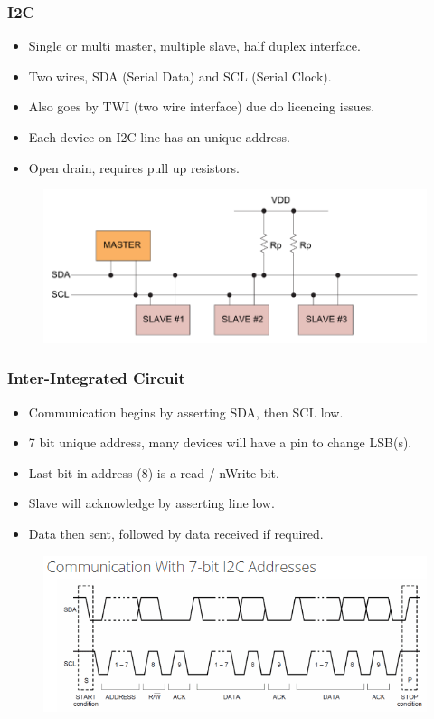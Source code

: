 \documentclass[t]{beamer}
\begin{document}

\begin{frame}[t]
\frametitle{I2C}
\begin{itemize}
	\item Single or multi master, multiple slave, half duplex interface.
	\item Two wires, SDA (Serial Data) and SCL (Serial Clock).
	\item Also goes by TWI (two wire interface) due do licencing issues.
	\item Each device on I2C line has an unique address. 
	\item Open drain, requires pull up resistors.
\end{itemize}
\begin{figure}
	\includegraphics[width=\linewidth]{i2cBus.png}
\end{figure}

\end{frame}



\begin{frame}[t]
\frametitle{Inter-Integrated Circuit}
\begin{itemize}
	\item Communication begins by asserting SDA, then SCL low.
	\item 7 bit unique address, many devices will have a pin to change LSB(s). 
	\item Last bit in address (8) is a read / nWrite bit. 
	\item Slave will acknowledge by asserting line low. 
	\item Data then sent, followed by data received if required. 
\end{itemize}
\begin{figure}
	\includegraphics[width=0.7\linewidth]{i2c.png}
\end{figure}

\end{frame}
\end{document}
